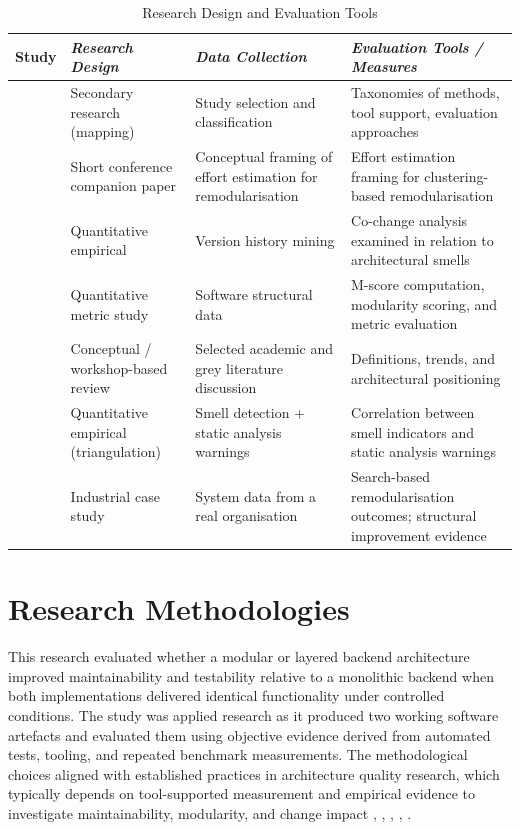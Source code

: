 \documentclass[conference]{IEEEtran}
\begin{document}
\begin{table}
\caption{Research Design and Evaluation Tools}
\label{tab2}
\centering
{\scriptsize
\begin{tabularx}{\columnwidth}{|c|Y|Y|Y|}
\hline
\textbf{Study} & \textbf{\textit{Research Design}} & \textbf{\textit{Data Collection}} & \textbf{\textit{Evaluation Tools / Measures}} \\
\hline
\cite{b1} & Secondary research (mapping) & Study selection and classification & Taxonomies of methods, tool support, evaluation approaches \\
\hline
\cite{b2} & Short conference companion paper & Conceptual framing of effort estimation for remodularisation & Effort estimation framing for clustering-based remodularisation \\
\hline
\cite{b3} & Quantitative empirical & Version history mining & Co-change analysis examined in relation to architectural smells \\
\hline
\cite{b4} & Quantitative metric study & Software structural data & M-score computation, modularity scoring, and metric evaluation \\
\hline
\cite{b5} & Conceptual / workshop-based review & Selected academic and grey literature discussion & Definitions, trends, and architectural positioning \\
\hline
\cite{b6} & Quantitative empirical (triangulation) & Smell detection + static analysis warnings & Correlation between smell indicators and static analysis warnings \\
\hline
\cite{b7} & Industrial case study & System data from a real organisation & Search-based remodularisation outcomes; structural improvement evidence \\
\hline
\end{tabularx}
}
\end{table}

\section{Research Methodologies}
This research evaluated whether a modular or layered backend architecture improved maintainability and testability relative to a monolithic backend when both implementations delivered identical functionality under controlled conditions. The study was applied research as it produced two working software artefacts and evaluated them using objective evidence derived from automated tests, tooling, and repeated benchmark measurements. The methodological choices aligned with established practices in architecture quality research, which typically depends on tool-supported measurement and empirical evidence to investigate maintainability, modularity, and change impact \cite{b1}, \cite{b3}, \cite{b4}, \cite{b6}, \cite{b7}.
\end{document}
